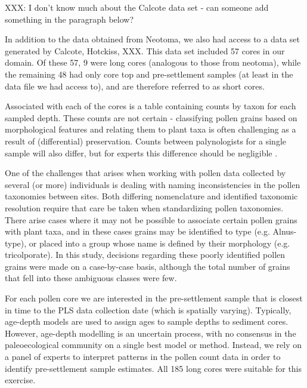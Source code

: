 \documentclass[12pt]{article}
\begin{document}
XXX: I don't know much about the Calcote data set - can someone add something in the paragraph below?

In addition to the data obtained from Neotoma, we also had access to a
data set generated by Calcote, Hotckiss, XXX. This data set included
57 cores in our domain. Of these 57, 9 were long cores (analogous to
those from neotoma), while the remaining 48 had only core top and
pre-settlement samples (at least in the data file we had access to),
and are therefore referred to as short cores.

Associated with each of the cores is a table containing counts by
taxon for each sampled depth. These counts are not certain -
classifying pollen grains based on morphological features and relating
them to plant taxa is often challenging as a result of (differential)
preservation. Counts between palynologists for a single sample will
also differ, but for experts this difference should be negligible
\citep{XXX}.

One of the challenges that arises when working with pollen data
collected by several (or more) individuals is dealing with naming
inconsistencies in the pollen taxonomies between sites. Both differing
nomenclature and identified taxonomic resolution require that care be
taken when standardizing pollen taxonomies. There arise cases where it
may not be possible to associate certain pollen grains with plant
taxa, and in these cases grains may be identified to type
(e.g. Alnus-type), or placed into a group whose name is defined by
their morphology (e.g. tricolporate). In this study, decisions
regarding these poorly identified pollen grains were made on a
case-by-case basis, although the total number of grains that fell into
these ambiguous classes were few.

For each pollen core we are interested in the pre-settlement sample
that is closest in time to the PLS data collection date (which is
spatially varying). Typically, age-depth models are used to assign
ages to sample depths to sediment cores. However, age-depth modelling
is an uncertain process, with no consensus in the paleoecological
community on a single best model or method. Instead, we rely on a
panel of experts to interpret patterns in the pollen count data in
order to identify pre-settlement sample estimates. All 185 long cores were
suitable for this exercise.
\end{document}
